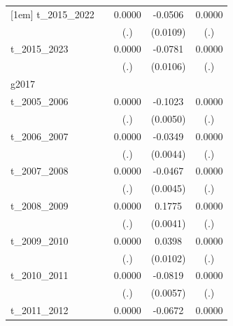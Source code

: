 \begin{table}[htbp]
\begin{tabular}{l*{4}{c}}
[1em]
t\_2015\_2022 &                     &      0.0000         &     -0.0506\sym{***}&      0.0000         \\
            &                     &         (.)         &    (0.0109)         &         (.)         \\
[1em]
t\_2015\_2023 &                     &      0.0000         &     -0.0781\sym{***}&      0.0000         \\
            &                     &         (.)         &    (0.0106)         &         (.)         \\
\hline
g2017       &                     &                     &                     &                     \\
t\_2005\_2006 &                     &      0.0000         &     -0.1023\sym{***}&      0.0000         \\
            &                     &         (.)         &    (0.0050)         &         (.)         \\
[1em]
t\_2006\_2007 &                     &      0.0000         &     -0.0349\sym{***}&      0.0000         \\
            &                     &         (.)         &    (0.0044)         &         (.)         \\
[1em]
t\_2007\_2008 &                     &      0.0000         &     -0.0467\sym{***}&      0.0000         \\
            &                     &         (.)         &    (0.0045)         &         (.)         \\
[1em]
t\_2008\_2009 &                     &      0.0000         &      0.1775\sym{***}&      0.0000         \\
            &                     &         (.)         &    (0.0041)         &         (.)         \\
[1em]
t\_2009\_2010 &                     &      0.0000         &      0.0398\sym{***}&      0.0000         \\
            &                     &         (.)         &    (0.0102)         &         (.)         \\
[1em]
t\_2010\_2011 &                     &      0.0000         &     -0.0819\sym{***}&      0.0000         \\
            &                     &         (.)         &    (0.0057)         &         (.)         \\
[1em]
t\_2011\_2012 &                     &      0.0000         &     -0.0672\sym{***}&      0.0000         \\

\end{tabular}
\end{table}
